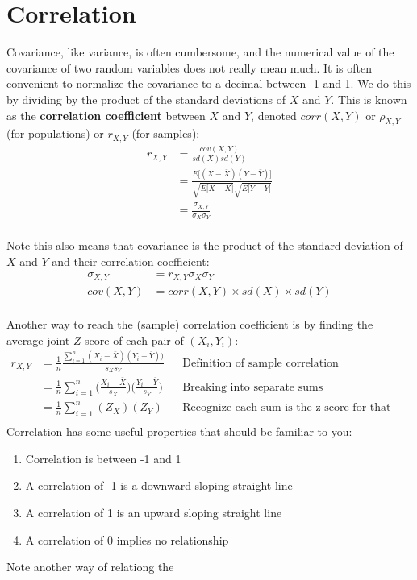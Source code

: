 \documentclass{article}
\begin{document}
\clearpage 

\section{Correlation}

Covariance, like variance, is often cumbersome, and the numerical value of the covariance of two random variables does not really mean much. It is often convenient to normalize the covariance to a decimal between -1 and 1. We do this by dividing by the product of the standard deviations of $X$ and $Y$. This is known as the \textbf{correlation coefficient} between $X$ and $Y$, denoted $corr(X,Y)$ or $\rho_{X,Y}$ (for populations) or $r_{X,Y}$ (for samples): 
\begin{align*}	
r_{X,Y}&=\frac{cov(X,Y)}{sd(X)sd(Y)}\\
&=\frac{E\big[(X-\bar{X})(Y-\bar{Y})\big]}{\sqrt{E\big[X-\bar{X}\big]}\sqrt{E\big[Y-\bar{Y}\big]}}\\
&=\frac{\sigma_{X,Y}}{\sigma_X \sigma_Y}\\
\end{align*}

Note this also means that covariance is the product of the standard deviation of $X$ and $Y$ and their correlation coefficient: 
\begin{align*}
\sigma_{X,Y}&=r_{X,Y}\sigma_X \sigma_Y	\\
cov(X,Y)&=corr(X,Y)\times sd(X) \times sd(Y)	\\
\end{align*}

Another way to reach the (sample) correlation coefficient is by finding the average joint $Z$-score of each pair of $(X_i,Y_i)$: 
\begin{align*}	
r_{X,Y}&=\frac{1}{n}\frac{\displaystyle\sum^n_{i=1}(X_i-\bar{X})(Y_i-\bar{Y}))}{s_X s_Y} && \text{Definition of sample correlation}\\
&=\frac{1}{n}\displaystyle\sum^n_{i=1}\bigg(\frac{X_i-\bar{X}}{s_X}\bigg)\bigg(\frac{Y_i-\bar{Y}}{s_Y}\bigg) && \text{Breaking into separate sums} \\
&=\frac{1}{n}\displaystyle\sum^n_{i=1}(Z_X)(Z_Y) && \text{Recognize each sum is the z-score for that r.v.} \\
\end{align*}
Correlation has some useful properties that should be familiar to you: 
\begin{enumerate}
	\item Correlation is between -1 and 1
	\item A correlation of -1 is a downward sloping straight line
	\item A correlation of 1 is an upward sloping straight line
	\item A correlation of 0 implies no relationship 
\end{enumerate}

Note another way of relationg the
\end{document}
